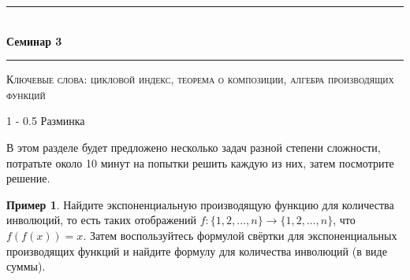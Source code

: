 \documentclass{article}
\makeatletter
\def \topic {Семинар 3}
\theoremstyle{definition}
\newtheorem{example}{Пример}
\renewcommand{\section}{\@startsection
{section}%
{1}%
{\z@}%
{-\baselineskip}%
{0.5\baselineskip}%
{\centering\large\scshape}} %
\makeatother
\begin{document}
\begin{center}

\newcommand{\HRule}{\rule{\linewidth}{0.5mm}}
\HRule \\[0.2cm]
{ \Large \bfseries \topic} %
\HRule

\end{center}

\textsc{Ключевые слова: 
цикловой индекс, теорема о композиции, алгебра производящих функций}

%
%

\section{Разминка}

В этом разделе будет предложено несколько задач разной степени сложности, 
потратьте около 10 минут на попытки решить каждую из них, затем посмотрите 
решение.


\begin{example}   Найдите экспоненциальную производящую функцию для количества 
инволюций, то есть таких отображений \( f \colon \{ 1, 2, \ldots, n \} \to \{ 
1, 2, \ldots, n \} \), что \( f(f(x)) = x \). Затем воспользуйтесь формулой 
свёртки для экспоненциальных производящих функций и найдите формулу для 
количества инволюций (в виде суммы).
\end{example}
\end{document}
